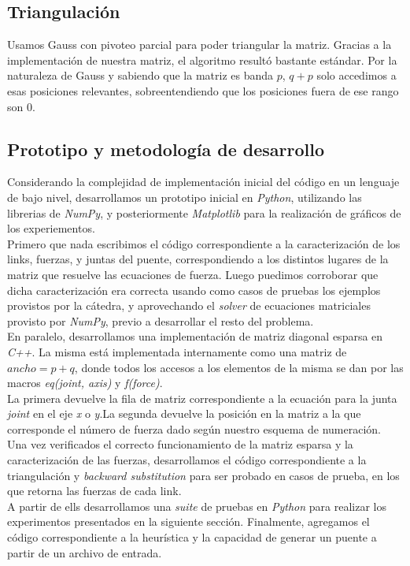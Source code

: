 \subsection{Triangulación}

Usamos Gauss con pivoteo parcial para poder triangular la matriz. Gracias a la implementación de nuestra matriz, el algoritmo resultó bastante estándar. Por la naturaleza de Gauss y sabiendo que la matriz es banda $p$, $q + p$ solo accedimos a esas posiciones relevantes, sobreentendiendo que los posiciones fuera de ese rango son $0$.

 \subsection{Prototipo y metodología de desarrollo}

Considerando la complejidad de implementación inicial del código en un lenguaje de bajo nivel, desarrollamos un prototipo inicial en \textit{Python}, utilizando las librerias de \textit{NumPy}, y posteriormente \textit{Matplotlib} para la realización de gráficos de los experiementos.\\

Primero que nada escribimos el código correspondiente a la caracterización de los links, fuerzas, y juntas del puente, correspondiendo a los distintos lugares de la matriz que resuelve las ecuaciones de fuerza. Luego puedimos corroborar que dicha caracterización era correcta usando como casos de pruebas los ejemplos provistos por la cátedra, y aprovechando el \textit{solver} de ecuaciones matriciales provisto por \textit{NumPy}, previo a desarrollar el resto del problema.\\

En paralelo, desarrollamos una implementación de matriz diagonal esparsa en \textit{C++}. La misma está implementada internamente como una matriz de $ancho = p + q$, donde todos los accesos a los elementos de la misma se dan por las macros \textit{eq(joint, axis)} y \textit{f(force)}.\\

La primera devuelve la fila de matriz correspondiente a la ecuación para la junta \textit{joint} en el eje \textit{x} o \textit{y}.La segunda devuelve la posición en la matriz a la que corresponde el número de fuerza dado según nuestro esquema de numeración.\\

Una vez verificados el correcto funcionamiento de la matriz esparsa y la caracterización de las fuerzas, desarrollamos el código correspondiente a la triangulación y \textit{backward substitution} para ser probado en casos de prueba, en los que retorna las fuerzas de cada link.\\

A partir de ells desarrollamos una \textit{suite} de pruebas en \textit{Python} para realizar los experimentos presentados en la siguiente sección. Finalmente, agregamos el código correspondiente a la heurística y la capacidad de generar un puente a partir de un archivo de entrada.


